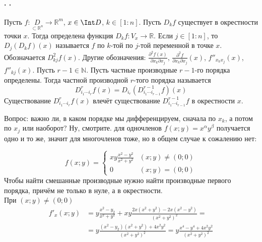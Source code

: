 \documentclass{article}
\begin{document}
    \paragraph{. .}
    \begin{itemize}
        \dfn Пусть $f\colon\underset{\subset\mathbb R^n}D\to\mathbb R^m$, $x\in\Int D$, $k\in[1:n]$. Пусть $D_kf$ существует в окрестности точки $x$. Тогда определена функция $D_kf\colon V_x\to\mathbb R$. Если $j\in[1:n]$, то $D_j(D_kf)(x)$ называется  $f$  по $k$-той по $j$-той переменной в точке $x$. Обозначается $D_{kj}^2f(x)$. Другие обозначения: $\frac{\partial^2f(x)}{\partial x_k\partial x_j}$, $\frac{\partial^2f}{\partial x_k\partial x_j}(x)$, $f''_{x_kx_j}(x)$, $f''_{kj}(x)$.
        \dfn Пусть $r-1\in\mathbb N$. Пусть частные производные $r-1$-го порядка определены. Тогда частной производной $r$-того порядка называется
        $$
        D^r_{i_1\cdots i_r}f(x)=D_{i_r}(D^{r-1}_{i_1\cdots i_{r-1}}f)(x)
        $$
        Существование $D^r_{i_1\cdots i_r}f(x)$ влечёт существование $D^{r-1}_{i_1\cdots i_{r-1}}f$ в окрестности $x$.
        \begin{Comment}
            Вопрос: важно ли, в каком порядке мы дифференцируем, сначала по $x_k$, а потом по $x_j$ или наоборот? Ну, смотрите. для одночленов $f(x;y)=x^\alpha y^\beta$ получается одно и то же, значит для многочленов тоже, но в общем случае к сожалению нет:
        \end{Comment}
        \begin{Example}
            $$
            f(x;y)=\begin{cases}
                xy\frac{x^2-y^2}{x^2+y^2} & (x;y)\neq(0;0)\\
                0 & (x;y)=(0;0)
            \end{cases}
            $$
            Чтобы найти смешанные производные нужно найти производные первого порядка, причём не только в нуле, а в окрестности.\\
            При $(x;y)\neq(0;0)$
            \[
            \begin{split}
                f'_x(x;y)&=y\frac{x^2-y_2}{x^2+y^2}+xy\frac{2x(x^2+y^2)-2x(x^2-y^2)}{(x^2+y^2)^2}=\\
                &=y\frac{(x^2-y_2)(x^2+y^2)+4x^2y^2}{(x^2+y^2)^2}=y\frac{x^4-y^4+4x^2y^2}{(x^2+y^2)^2}
            \end{split}
\]
\end{Example}
\end{itemize}
\end{document}
